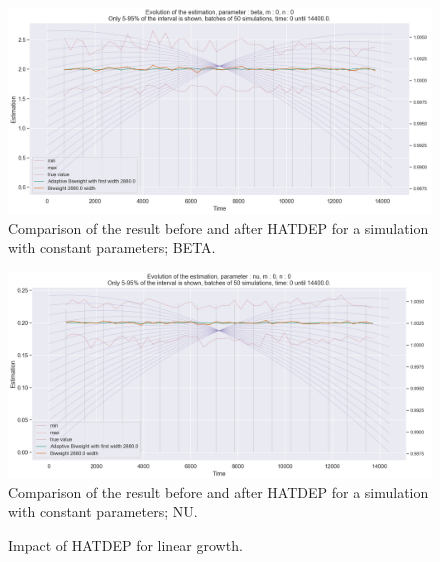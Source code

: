 \begin{figure}
\centering
\includegraphics[width = 0.90 \textwidth]{../imag/chap3/0/B.png}
\caption{Comparison of the result before and after HATDEP for a simulation with constant parameters; BETA.}
\label{fig:first_estimate_0_beta}
\end{figure}

\begin{figure}
\centering
\includegraphics[width = 0.90 \textwidth]{../imag/chap3/0/C.png}
\caption{Comparison of the result before and after HATDEP for a simulation with constant parameters; NU.}
\label{fig:first_estimate_0_nu}
\end{figure}











\begin{figure}
\centering
{} 
\caption{Impact of HATDEP for linear growth.}
\label{fig:compar_kernels_1}
\end{figure}

